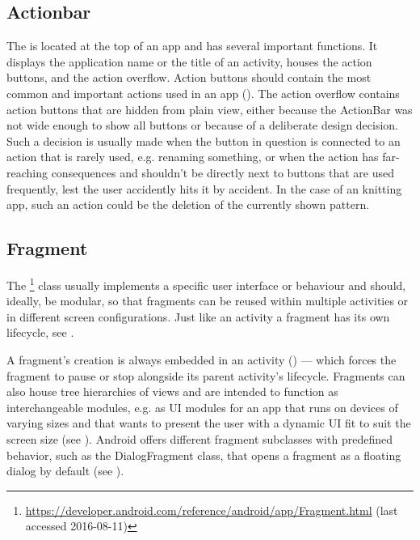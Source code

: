 \subsection{Actionbar}
The  is located at the top of an app and has several important functions. It displays the application name or the title of an activity, houses the action buttons, and the action overflow. Action buttons should contain the most common and important actions used in an app (\cite{actionbar}). The action overflow contains action buttons that are hidden from plain view, either because the ActionBar was not wide enough to show all buttons or because of a deliberate design decision. Such a decision is usually made when the button in question is connected to an action that is rarely used, e.g. renaming something, or when the action has far-reaching consequences and shouldn't be directly next to buttons that are used frequently, lest the user accidently hits it by accident. In the case of an knitting app, such an action could be the deletion of the currently shown pattern. 

\subsection{Fragment}
\label{impl:fragment}
The \footnote{\url{https://developer.android.com/reference/android/app/Fragment.html} (last accessed 2016-08-11)} class usually implements a specific user interface or behaviour and should, ideally, be modular, so that fragments can be reused within multiple activities or in different screen configurations. Just like an activity a fragment has its own lifecycle, see .

A fragment's creation is always embedded in an activity (\cite{androidfragment}) --- which forces the fragment to pause or stop alongside its parent activity's lifecycle. Fragments can also house tree hierarchies of views and are intended to function as interchangeable modules, e.g. as \gls{UI} modules for an app that runs on devices of varying sizes and that wants to present the user with a dynamic \gls{UI} fit to suit the screen size (see ). Android offers different fragment subclasses with predefined behavior, such as the DialogFragment class, that opens a fragment as a floating dialog by default (see ).

